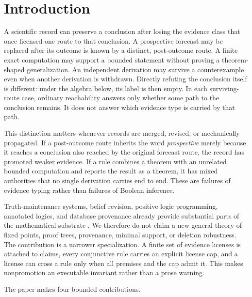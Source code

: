 \documentclass[pdflatex,sn-mathphys-num]{sn-jnl}
\begin{document}
\section{Introduction}\label{introduction}

A scientific record can preserve a conclusion after losing the evidence class that once licensed one route to that conclusion. A prospective forecast may be replaced after its outcome is known by a distinct, post-outcome route. A finite exact computation may support a bounded statement without proving a theorem-shaped generalization. An independent derivation may survive a counterexample even when another derivation is withdrawn. Directly refuting the conclusion itself is different: under the algebra below, its label is then empty. In each surviving-route case, ordinary reachability answers only whether some path to the conclusion remains. It does not answer which evidence type is carried by that path.

This distinction matters whenever records are merged, revised, or mechanically propagated. If a post-outcome route inherits the word \emph{prospective} merely because it reaches a conclusion also reached by the original forecast route, the record has promoted weaker evidence. If a rule combines a theorem with an unrelated bounded computation and reports the result as a theorem, it has mixed authorities that no single derivation carries end to end. These are failures of evidence typing rather than failures of Boolean inference.

Truth-maintenance systems, belief revision, positive logic programming, annotated logics, and database provenance already provide substantial parts of the mathematical substrate \citep{doyle1979, martins1988, agm1985, kifer1992, green2007, cheney2009}. We therefore do not claim a new general theory of fixed points, proof trees, provenance, minimal support, or deletion robustness. The contribution is a narrower specialization. A finite set of evidence licenses is attached to claims, every conjunctive rule carries an explicit license cap, and a license can cross a rule only when all premises and the cap admit it. This makes nonpromotion an executable invariant rather than a prose warning.

The paper makes four bounded contributions.
\end{document}
